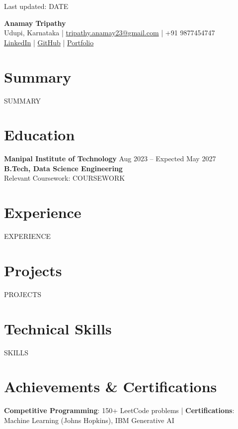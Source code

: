 \documentclass[a4paper,10pt]{article}
\begin{document}
\begin{flushright}
{\small Last updated: {{DATE}}}
\end{flushright}
\vspace{-20pt}

\begin{center}
{\fontsize{28}{32}\selectfont \textbf{Anamay Tripathy}}\\[2pt]

{\small Udupi, Karnataka \;|\;
\href{mailto:tripathy.anamay23@gmail.com}{tripathy.anamay23@gmail.com} \;|\;
+91 9877454747}\\[1pt]

\href{https://www.linkedin.com/in/anamay-tripathy-b53829296/}{LinkedIn} \;|\;
\href{https://github.com/Flamechargerr}{GitHub} \;|\;
\href{https://anamay.vercel.app/}{Portfolio}
\end{center}
\vspace{-2pt}

\section*{Summary}
{{SUMMARY}}

\section*{Education}
\textbf{Manipal Institute of Technology} \hfill Aug 2023 -- Expected May 2027\\
\textbf{B.Tech, Data Science Engineering} \hfill\\
Relevant Coursework: {{COURSEWORK}}

\section*{Experience}

{{EXPERIENCE}}

\section*{Projects}

{{PROJECTS}}

\section*{Technical Skills}
{{SKILLS}}

\section*{Achievements & Certifications}
\textbf{Competitive Programming}: 150+ LeetCode problems \;|\; \textbf{Certifications}: Machine Learning (Johns Hopkins), IBM Generative AI
\end{document}
